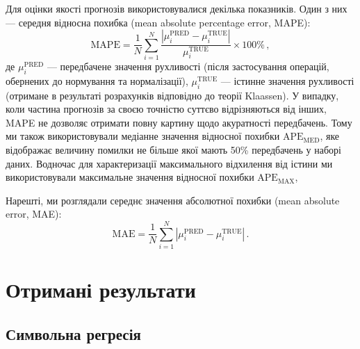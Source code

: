 \documentclass[12pt,a4paper,titlepage,oneside]{book}
\numberwithin{equation}{part}
\begin{document}
Для оцінки якості прогнозів використовувалися декілька показників.
Один з них --- середня відносна похибка (mean absolute percentage error, MAPE):
\begin{equation}
\label{eqMAPE}
    \mathrm{MAPE} = \frac{1}{N}\displaystyle\sum_{i=1}^{N} \frac{|\mu^\mathrm{PRED}_i-\mu^\mathrm{TRUE}_i|}{\mu^\mathrm{TRUE}_i}\times 100 \%\,,
\end{equation}
де
$\mu^\mathrm{PRED}_i$ --- передбачене значення рухливості (після застосування операцій, обернених до нормування та нормалізації),
$\mu^\mathrm{TRUE}_i$ --- істинне значення рухливості (отримане в результаті розрахунків відповідно до теорії Klaassen).
У випадку, коли частина прогнозів за своєю точністю суттєво відрізняються від інших, MAPE  не дозволяє отримати повну картину щодо акуратності передбачень.
Тому ми також використовували медіанне значення відносної похибки $\mathrm{APE}_\mathrm{MED}$,
яке відображає величину помилки не більше якої мають 50\% передбачень у наборі даних.
Водночас для характеризації максимального відхилення від істини ми використовували максимальне значення  відносної похибки
$\mathrm{APE}_\mathrm{MAX}$,

Нарешті, ми розглядали середнє значення абсолютної похибки (mean absolute error, MAE):
\begin{equation}
\label{eqMAE}
    \mathrm{MAE} = \frac{1}{N}\displaystyle\sum_{i=1}^{N} |\mu^\mathrm{PRED}_i-\mu^\mathrm{TRUE}_i|\,.
\end{equation}


\chapter{Отримані результати}

\section{Символьна регресія}
\end{document}
